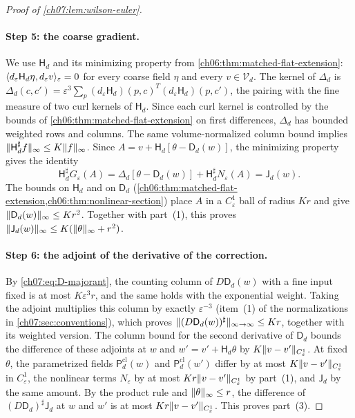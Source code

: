 \begin{proof}[Proof of \cref{ch07:lem:wilson-euler}]
\paragraph{Step 5: the coarse gradient.}
We use $\mathsf H_d$ and its minimizing property from \cref{ch06:thm:matched-flat-extension}: $\langle d_\varepsilon\mathsf H_d\eta,d_\varepsilon v\rangle_\varepsilon=0$ for every coarse field $\eta$ and every $v\in\mathcal V_d$. The kernel of $\Delta_d$ is $\Delta_d(c,c')=\varepsilon^3\sum_p(d_\varepsilon\mathsf H_d)(p,c)^T(d_\varepsilon\mathsf H_d)(p,c')$, the pairing with the fine measure of two curl kernels of $\mathsf H_d$. Since each curl kernel is controlled by the bounds of \cref{ch06:thm:matched-flat-extension} on first differences, $\Delta_d$ has bounded weighted rows and columns. The same volume-normalized column bound implies $\lVert \mathsf H_d^\sharp f\rVert_\infty\le K\lVert f\rVert_\infty$. Since $A=v+\mathsf H_d[\theta-\mathsf D_d(w)]$, the minimizing property gives the identity
\[
 \mathsf H_d^\sharp G_\varepsilon(A)=\Delta_d[\theta-\mathsf D_d(w)]+\mathsf H_d^\sharp N_\varepsilon(A)=\mathsf J_d(w).
\]
The bounds on $\mathsf H_d$ and on $\mathsf D_d$ (\cref{ch06:thm:matched-flat-extension,ch06:thm:nonlinear-section}) place $A$ in a $C^1_\varepsilon$ ball of radius $Kr$ and give $\lVert \mathsf D_d(w)\rVert_\infty\le Kr^2$. Together with part~(1), this proves $\lVert \mathsf J_d(w)\rVert_\infty\le K(\lVert \theta\rVert_\infty+r^2)$.

\paragraph{Step 6: the adjoint of the derivative of the correction.}
By \eqref{ch07:eq:D-majorant}, the counting column of $D\mathsf D_d(w)$ with a fine input fixed is at most $K\varepsilon^3r$, and the same holds with the exponential weight. Taking the adjoint multiplies this column by exactly $\varepsilon^{-3}$ (item~(1) of the normalizations in \cref{ch07:sec:conventions}), which proves $\lVert (D\mathsf D_d(w))^\sharp\rVert_{\infty\to\infty}\le Kr$, together with its weighted version. The column bound for the second derivative of $\mathsf D_d$ bounds the difference of these adjoints at $w$ and $w'=v'+\mathsf H_d\theta$ by $K\lVert v-v'\rVert_{C^1_\varepsilon}$. At fixed $\theta$, the parametrized fields $\mathsf P_d^{\mathrm{cl}}(w)$ and $\mathsf P_d^{\mathrm{cl}}(w')$ differ by at most $K\lVert v-v'\rVert_{C^1_\varepsilon}$ in $C^1_\varepsilon$, the nonlinear terms $N_\varepsilon$ by at most $Kr\lVert v-v'\rVert_{C^1_\varepsilon}$ by part~(1), and $\mathsf J_d$ by the same amount. By the product rule and $\lVert \theta\rVert_\infty\le r$, the difference of $(D\mathsf D_d)^\sharp\mathsf J_d$ at $w$ and $w'$ is at most $Kr\lVert v-v'\rVert_{C^1_\varepsilon}$. This proves part~(3).


\end{proof}
